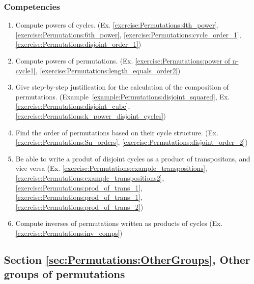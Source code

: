 \subsubsection*{Competencies}
\begin{enumerate}
\item
Compute powers of cycles. (Ex. \ref{exercise:Permutations:4th_power}, \ref{exercise:Permutations:6th_power}, \ref{exercise:Permutations:cycle_order_1}, \ref{exercise:Permutations:disjoint_order_1})
\item
Compute powers of permutations. (Ex. \ref{exercise:Permutations:power of n-cycle1}, \ref{exercise:Permutations:length_equals_order2})
\item
Give step-by-step justification for the calculation of the composition of permutations. (Example~\ref{example:Permutations:disjoint_squared},  Ex. \ref{exercise:Permutations:disjoint_cube}, \ref{exercise:Permutations:k_power_disjoint_cycles})
\item
Find the order of permutations based on their cycle structure. (Ex. \ref{exercise:Permutations:Sn_orders}, \ref{exercise:Permutations:disjoint_order_2})
\item
Be able to write a produt of disjoint cycles as a product of transpositons, and vice versa (Ex. \ref{exercise:Permutations:example_transpositions}, \ref{exercise:Permutations:example_transpositions2}, \ref{exercise:Permutations:prod_of_trans_1}, \ref{exercise:Permutations:prod_of_trans_1}, \ref{exercise:Permutations:prod_of_trans_2})
\item
Compute inverses of permutations written as products of cycles (Ex. \ref{exercise:Permutations:inv_comps})
\end{enumerate}


\subsection*{Section \ref{sec:Permutations:OtherGroups}, Other groups of permutations}

